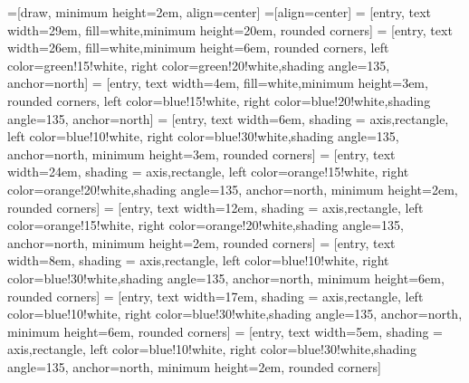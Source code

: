 
\usetikzlibrary{calc,positioning}
\usetikzlibrary{arrows.meta}

=[draw, minimum height=2em, align=center]
=[align=center]
 = [entry, text width=29em, fill=white,minimum height=20em, rounded corners]
 = [entry, text width=26em, fill=white,minimum height=6em, rounded corners, left color=green!15!white, right color=green!20!white,shading angle=135, anchor=north]
 = [entry, text width=4em, fill=white,minimum height=3em, rounded corners, left color=blue!15!white, right color=blue!20!white,shading angle=135, anchor=north]
 = [entry, text width=6em, shading = axis,rectangle, left color=blue!10!white, right color=blue!30!white,shading angle=135, anchor=north,
minimum height=3em, rounded corners]
 = [entry, text width=24em, shading = axis,rectangle, left color=orange!15!white, right color=orange!20!white,shading angle=135, anchor=north,
minimum height=2em, rounded corners]
 = [entry, text width=12em, shading = axis,rectangle, left color=orange!15!white, right color=orange!20!white,shading angle=135, anchor=north,
minimum height=2em, rounded corners]
 = [entry, text width=8em, shading = axis,rectangle, left color=blue!10!white, right color=blue!30!white,shading angle=135, anchor=north,
minimum height=6em, rounded corners]
 = [entry, text width=17em, shading = axis,rectangle, left color=blue!10!white, right color=blue!30!white,shading angle=135, anchor=north,
minimum height=6em, rounded corners]
 = [entry, text width=5em, shading = axis,rectangle, left color=blue!10!white, right color=blue!30!white,shading angle=135, anchor=north,
minimum height=2em, rounded corners]
\def\blockdist{2.3}
\def\edgedist{2.5}

